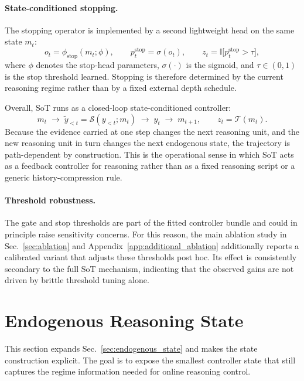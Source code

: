 \paragraph{State-conditioned stopping.}
The stopping operator is implemented by a second lightweight head on the same state \(m_t\):
\begin{equation}
o_t=\phi_{\mathrm{stop}}(m_t;\phi), \qquad
p_t^{\mathrm{stop}}=\sigma(o_t), \qquad
z_t=\mathbb{I}\bigl[p_t^{\mathrm{stop}}>\tau\bigr],
\label{eq:app_stop_prob}
\end{equation}
where \(\phi\) denotes the stop-head parameters, \(\sigma(\cdot)\) is the sigmoid, and \(\tau\in(0,1)\) is the stop threshold learned. 
Stopping is therefore determined by the current reasoning regime rather than by a fixed external depth schedule.

Overall, SoT runs as a closed-loop state-conditioned controller:
\begin{equation}
m_t
\;\rightarrow\;
\widetilde{y}_{<t}=\mathcal{S}(y_{<t};m_t)
\;\rightarrow\;
y_t
\;\rightarrow\;
m_{t+1},
\qquad
z_t=\mathcal{T}(m_t).
\label{eq:app_closed_loop}
\end{equation}
Because the evidence carried at one step changes the next reasoning unit, and the new reasoning unit in turn changes the next endogenous state, the trajectory is path-dependent by construction. 
This is the operational sense in which SoT acts as a feedback controller for reasoning rather than as a fixed reasoning script or a generic history-compression rule.

\paragraph{Threshold robustness.}
The gate and stop thresholds are part of the fitted controller bundle and could in principle raise sensitivity concerns. 
For this reason, the main ablation study in Sec.~\ref{sec:ablation} and Appendix~\ref{app:additional_ablation} additionally reports a calibrated variant that adjusts these thresholds post hoc. 
Its effect is consistently secondary to the full SoT mechanism, indicating that the observed gains are not driven by brittle threshold tuning alone.

\section{Endogenous Reasoning State}
\label{app:endogenous_state}

This section expands Sec.~\ref{sec:endogenous_state} and makes the state construction explicit. 
The goal is to expose the smallest controller state that still captures the regime information needed for online reasoning control.

